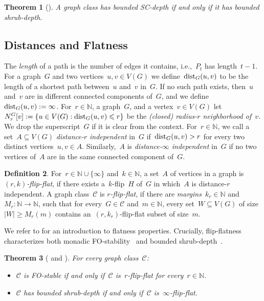 \documentclass[11pt]{article}      \usepackage[margin=1in]{geometry}  \usepackage{microtype}
\newtheorem{theorem}{Theorem}[section]
\theoremstyle{definition}
\newtheorem{definition}[theorem]{Definition}
\newcommand{\N}[0]{\mathrm{\mathbb{N}}}
\newcommand{\dist}{\textnormal{dist}}
\newcommand{\CC}{\mathcal{C}}
\renewcommand{\le}{\leqslant}
\renewcommand{\leq}{\le}
\renewcommand{\ge}{\geqslant}
\renewcommand{\geq}{\ge}
\begin{document}
\begin{theorem}[\cite{shrubdepth}]\label{thm:sc-depth}
    A graph class has bounded SC-depth if and only if it has bounded shrub-depth.
\end{theorem}



\subsection{Distances and Flatness}
The \emph{length} of a path is the number of edges it contains, i.e.,~$P_t$ has length~$t-1$.
For a graph~$G$ and two vertices~$u,v \in V(G)$ we define~$\dist_G(u,v)$ to be the length of a shortest path between~$u$ and~$v$ in~$G$.
If no such path exists, then~$u$ and~$v$ are in different connected components of~$G$, and we define~$\dist_G(u,v) := \infty$.
For~$r\in\N$, a graph~$G$, and a vertex~$v \in V(G)$ let~$N_r^G[v] := \{u \in V(G) : \dist_G(u,v) \leq r\}$ be the \emph{(closed) radius-$r$ neighborhood of~$v$}.
We drop the superscript~$G$ if it is clear from the context.
For~$r\in\N$, we call a set~$A \subseteq V(G)$ \emph{distance-$r$ independent}  in~$G$ if~$\dist_G(u,v) > r$ for every two distinct vertices~$u,v \in A$.
Similarly,~$A$ is \emph{distance-$\infty$ independent} in~$G$ if no two vertices of~$A$ are in the same connected component of~$G$.
\begin{definition}
    For~$r\in \N \cup \{\infty\}$ and~$k\in\N$, a set~$A$ of vertices in a graph is \emph{$(r,k)$-flip-flat}, if there exists a~$k$-flip~$H$ of~$G$ in which~$A$ is distance-$r$ independent.
    A graph class~$\CC$ is 
    \emph{$r$-flip-flat},
        if there are \emph{margins}~$k_r\in\N$ and~$M_r:\N\to\N$, such that for every~$G\in\CC$ and~$m\in\N$, every set~$W \subseteq V(G)$ of size~$|W|\geq M_r(m)$ contains an~$(r,k_r)$-flip-flat subset of size~$m$.
\end{definition}

We refer to \cite{maehlmann-thesis} for an introduction to flatness properties.
Crucially, flip-flatness characterizes both monadic FO-stability~\cite{dreier2022indiscernibles} and bounded shrub-depth~\cite{dreier2024flipbreakability}.

\begin{theorem}[{\cite{dreier2022indiscernibles} and \cite{dreier2024flipbreakability}}]\label{thm:flip-flat}
    For every graph class~$\CC$:
    \begin{itemize}
        \item $\CC$ is FO-stable if and only if~$\CC$ is~$r$-flip-flat for every~$r\in\N$.
        \item $\CC$ has bounded shrub-depth if and only if~$\CC$ is~$\infty$-flip-flat.
    \end{itemize}
\end{theorem}
\end{document}
